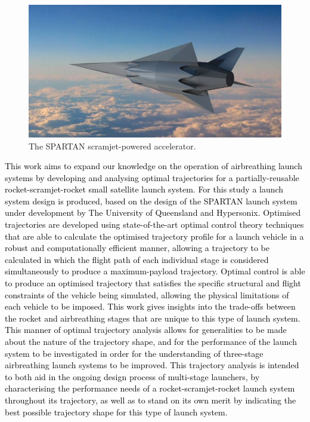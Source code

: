   	     	  	\begin{figure}[ht]
  	     	  		\centering
  	     	  		\includegraphics[width=0.6\linewidth]{figures/1_introduction/project-spartan}
  	     	  		\caption{The SPARTAN scramjet-powered accelerator\cite{BBC}.}
  	     	  		\label{fig:project-spartan}
  	     	  	\end{figure}
  	   \textcolor{black}{
  	   This work aims to expand our knowledge on the operation of airbreathing launch systems by developing and analysing optimal trajectories for a partially-reusable rocket-scramjet-rocket small satellite launch system. For this study a launch system design is produced, based on the design of the SPARTAN launch system under development by The University of Queensland and Hypersonix\cite{Preller2017b}.
  	   Optimised trajectories are developed using state-of-the-art optimal control theory techniques that are able to calculate the optimised trajectory profile for a launch vehicle in a robust and computationally efficient manner, allowing a trajectory to be calculated in which the flight path of each individual stage is considered simultaneously to produce a maximum-payload trajectory\cite{Betts1998}. 
  	   Optimal control is able to produce an optimised trajectory that satisfies the specific structural and flight constraints of the vehicle being simulated, allowing the physical limitations of each vehicle  to be imposed\cite{Betts1998}.
  	   This work gives insights into the trade-offs between the rocket and airbreathing stages that are unique to this type of launch system. This manner of optimal trajectory analysis allows for generalities to be made about the nature of the trajectory shape, and for the performance of the launch system to be investigated in order for the understanding of three-stage airbreathing launch systems to be improved.
  	   This trajectory analysis is intended to both aid in the ongoing design process of multi-stage launchers, by characterising the performance needs of a rocket-scramjet-rocket launch system throughout its trajectory, as well as to stand on its own merit by indicating the best possible trajectory shape for this type of launch system. 
  	}
  	   
